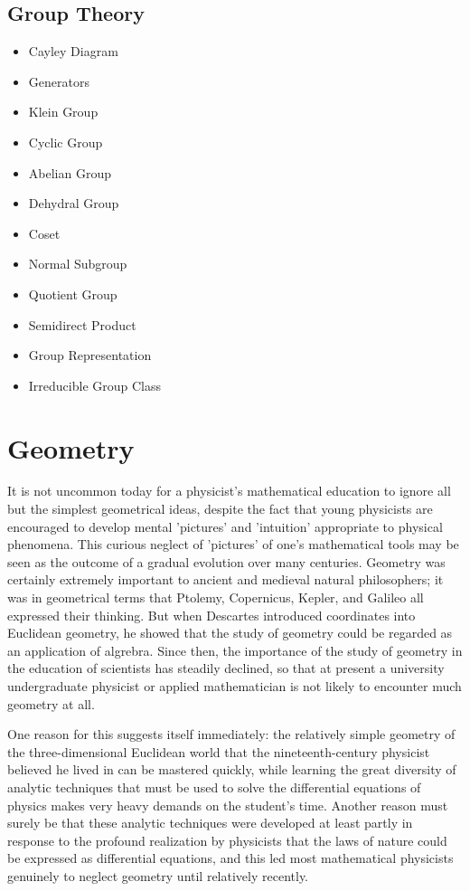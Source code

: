 \documentclass[10pt]{article}
\begin{document}
\subsection{Group Theory}
\begin{itemize}
	\item Cayley Diagram
	\item Generators
	\item Klein Group
	\item Cyclic Group
	\item Abelian Group
	\item Dehydral Group
	\item Coset
	\item Normal Subgroup
	\item Quotient Group
	\item Semidirect Product
	\item Group Representation 
	\item Irreducible Group Class
\end{itemize}
\section{Geometry}
It is not uncommon today for a physicist's mathematical education to ignore all but the simplest geometrical ideas, despite the fact that young physicists are encouraged to develop mental 'pictures' and 'intuition' appropriate to physical phenomena.
This curious neglect of 'pictures' of one's mathematical tools may be seen as the
outcome of a gradual evolution over many centuries. Geometry was certainly
extremely important to ancient and medieval natural philosophers; it was in
geometrical terms that Ptolemy, Copernicus, Kepler, and Galileo all expressed
their thinking. But when Descartes introduced coordinates into Euclidean
geometry, he showed that the study of geometry could be regarded as an application of algrebra. Since then, the importance of the study of geometry in the education of scientists has steadily declined, so that at present a university undergraduate physicist or applied mathematician is not likely to encounter
much geometry at all.

One reason for this suggests itself immediately: the relatively simple geometry
of the three-dimensional Euclidean world that the nineteenth-century physicist
believed he lived in can be mastered quickly, while learning the great diversity of
analytic techniques that must be used to solve the differential equations of
physics makes very heavy demands on the student's time. Another reason must
surely be that these analytic techniques were developed at least partly in
response to the profound realization by physicists that the laws of nature could
be expressed as differential equations, and this led most mathematical physicists
genuinely to neglect geometry until relatively recently.
\end{document}
